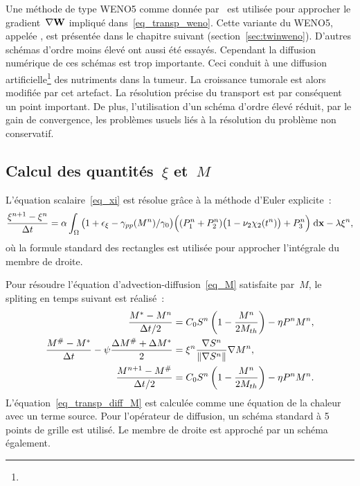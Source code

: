 \documentclass[main.tex]{subfiles}
\begin{document}
Une méthode de type WENO5 comme donnée par~\cite{shu1988efficient,Liu1994,gottlieb2006fifth} est utilisée pour approcher le gradient~$\nabla {\bf W}$ impliqué  dans~\eqref{eq_transp_weno}. Cette variante du WENO5, appelée \twinweno, est présentée dans le chapitre suivant (section~\ref{sec:twinweno}). 
D'autres schémas d'ordre moins élevé ont aussi été essayés. Cependant la diffusion numérique de ces schémas est trop importante. Ceci conduit à une diffusion artificielle\footnote{} des nutriments dans la tumeur. La croissance tumorale est alors modifiée par cet artefact. La résolution précise du transport est par conséquent un point important. De plus, l'utilisation d'un schéma d'ordre élevé réduit, par le gain de convergence, les problèmes usuels liés à la résolution du problème non conservatif.

\subsection{Calcul des quantités~$\xi$ et~$M$}
L'équation scalaire~\eqref{eq_xi} est résolue grâce à la méthode d'Euler explicite~:
\begin{equation}\label{eq:xi_disc}
\dfrac{\xi^{n+1}-\xi^n}{\Delta t} = \alpha \int_\Omega \big(1+\epsilon_{\xi} - \gamma_{pp}(M^n) / \gamma_0 \big)\Big((P_1^n +P_2^n) \big(1-\nu_2 \chi_2(t^n) \big)+P_3^n \Big) \textrm{\;d}\mathbf{x} - \lambda \xi^n,
\end{equation} 
où la formule standard des rectangles est utilisée pour approcher l'intégrale du membre de droite.


Pour résoudre l'équation d'advection-diffusion~\eqref{eq_M}
satisfaite par~$M$, le spliting en temps suivant est réalisé~:
\begin{align}
\dfrac{M^*-M^n}{\Delta t/2} &= C_0 S^n \left( 1-\dfrac{M^n}{2\Ms}\right) - \eta P^nM^n, %
\\
\dfrac{M^{\#}-M^*}{\Delta t} - \psi \dfrac{ \Delta M^\# + \Delta M^*}{2} &= \xi^n  \dfrac{\nabla S^n}{\| \nabla S^n \| }\nabla M^n, %
\label{eq_transp_diff_M}\\
\dfrac{M^{n+1}-M^\#}{\Delta t/2} &= C_0 S^n \left( 1-\dfrac{M^n}{2\Ms}\right) - \eta P^nM^n. \label{eq_snd_membre_M}
\end{align}
L'équation~\eqref{eq_transp_diff_M} est calculée comme une équation de la chaleur avec un terme source.  Pour l'opérateur de diffusion, un schéma standard à 5 points de grille est utilisé. Le membre de droite est approché par un schéma \twinweno également.
\end{document}
